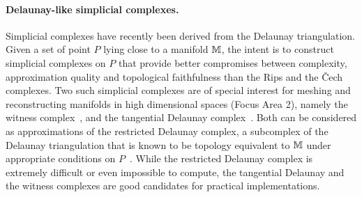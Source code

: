\paragraph{Delaunay-like  simplicial complexes.} 
Simplicial complexes have recently been derived from the Delaunay triangulation. Given a set of point $P$ lying close to a manifold $\mathbb M$, the intent is to construct simplicial complexes on $P$ that provide better compromises between complexity, approximation quality and topological faithfulness than the Rips and the \v{C}ech complexes.  Two such simplicial complexes are of special interest for meshing and reconstructing manifolds in high dimensional spaces (Focus Area 2), namely
 the witness
complex~\cite{cds-tewc-2004}, and the tangential Delaunay
complex~\cite{geometrica-7142i}.
Both can be considered as approximations of the restricted Delaunay complex, a subcomplex of the Delaunay triangulation that is known to be topology equivalent to $\mathbb M$ under appropriate conditions on $P$~\cite{dey-csr-2007}. %
While the restricted Delaunay complex is extremely difficult or even impossible to compute, the tangential Delaunay and the witness complexes are good candidates for practical implementations. %

